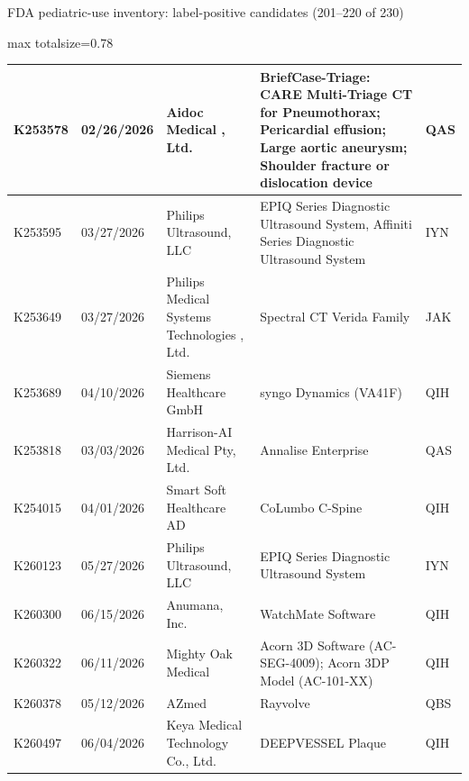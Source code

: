 \documentclass[aspectratio=169]{beamer}
\begin{document}
\begin{frame}[category=FDA appendix]{FDA pediatric-use inventory: label-positive candidates (201--220 of 230)}
\begin{adjustbox}{max totalsize={\textwidth}{0.78\textheight}}
\begin{tabular}{|p{}|p{}|p{}|p{}|p{}|}
K253578 & 02/26/2026 & Aidoc Medical , Ltd. & BriefCase-Triage: CARE Multi-Triage CT for Pneumothorax; Pericardial effusion; Large aortic aneurysm; Shoulder fracture or dislocation device & QAS \\ \hline
K253595 & 03/27/2026 & Philips Ultrasound, LLC & EPIQ Series Diagnostic Ultrasound System, Affiniti Series Diagnostic Ultrasound System & IYN \\ \hline
K253649 & 03/27/2026 & Philips Medical Systems Technologies , Ltd. & Spectral CT Verida Family & JAK \\ \hline
K253689 & 04/10/2026 & Siemens Healthcare GmbH & syngo Dynamics (VA41F) & QIH \\ \hline
K253818 & 03/03/2026 & Harrison-AI Medical Pty, Ltd. & Annalise Enterprise & QAS \\ \hline
K254015 & 04/01/2026 & Smart Soft Healthcare AD & CoLumbo C-Spine & QIH \\ \hline
K260123 & 05/27/2026 & Philips Ultrasound, LLC & EPIQ Series Diagnostic Ultrasound System & IYN \\ \hline
K260300 & 06/15/2026 & Anumana, Inc. & WatchMate Software & QIH \\ \hline
K260322 & 06/11/2026 & Mighty Oak Medical & Acorn 3D Software (AC-SEG-4009); Acorn 3DP Model (AC-101-XX) & QIH \\ \hline
K260378 & 05/12/2026 & AZmed & Rayvolve & QBS \\ \hline
K260497 & 06/04/2026 & Keya Medical Technology Co., Ltd. & DEEPVESSEL Plaque & QIH \\ \hline
\end{tabular}
\end{adjustbox}
\end{frame}
\end{document}
